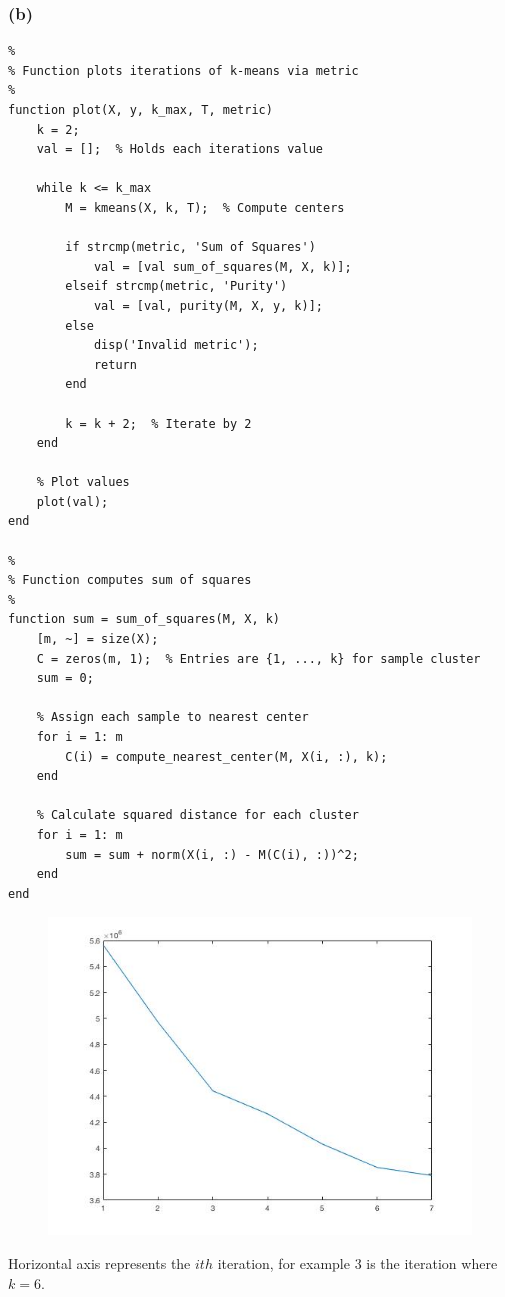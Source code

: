\documentclass[11pt, oneside]{article}   	%
\begin{document}
\subsubsection{(b)}
\begin{verbatim}
%
% Function plots iterations of k-means via metric
%
function plot(X, y, k_max, T, metric)
    k = 2;
    val = [];  % Holds each iterations value
    
    while k <= k_max
        M = kmeans(X, k, T);  % Compute centers
        
        if strcmp(metric, 'Sum of Squares')
            val = [val sum_of_squares(M, X, k)]; 
        elseif strcmp(metric, 'Purity')
            val = [val, purity(M, X, y, k)];
        else
            disp('Invalid metric');
            return
        end
        
        k = k + 2;  % Iterate by 2
    end
    
    % Plot values
    plot(val);
end

%
% Function computes sum of squares
%
function sum = sum_of_squares(M, X, k)
    [m, ~] = size(X);
    C = zeros(m, 1);  % Entries are {1, ..., k} for sample cluster
    sum = 0;
    
    % Assign each sample to nearest center
    for i = 1: m
        C(i) = compute_nearest_center(M, X(i, :), k);
    end
    
    % Calculate squared distance for each cluster
    for i = 1: m
        sum = sum + norm(X(i, :) - M(C(i), :))^2;
    end
end
\end{verbatim}
\begin{figure}[h!]
\includegraphics[width=\textwidth]{sum_of_squares.jpg}
\end{figure}
Horizontal axis represents the $ith$ iteration, for example $3$ is the iteration where $k = 6$.
\newpage{}
\end{document}
